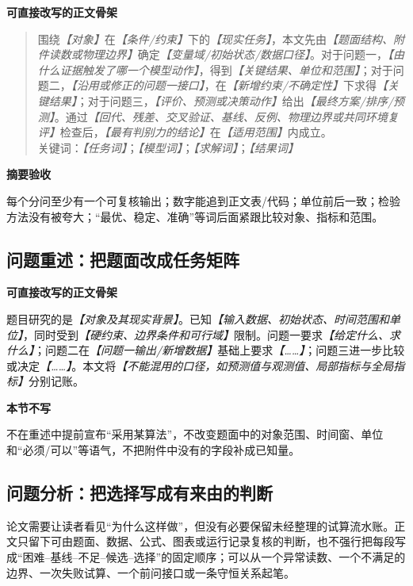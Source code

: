 \documentclass[UTF8,zihao=-4]{ctexart}
\newcommand{\slot}[1]{\textcolor{inkblue}{\textit{【#1】}}}
\newcommand{\guidehead}[1]{\par\medskip\noindent\textbf{\color{inkblue}#1}\par}
\begin{document}
\guidehead{可直接改写的正文骨架}
\begin{quote}\small
围绕\slot{对象}在\slot{条件/约束}下的\slot{现实任务}，本文先由\slot{题面结构、附件读数或物理边界}确定\slot{变量域/初始状态/数据口径}。对于问题一，\slot{由什么证据触发了哪一个模型动作}，得到\slot{关键结果、单位和范围}；对于问题二，\slot{沿用或修正的问题一接口}，在\slot{新增约束/不确定性}下求得\slot{关键结果}；对于问题三，\slot{评价、预测或决策动作}给出\slot{最终方案/排序/预测}。通过\slot{回代、残差、交叉验证、基线、反例、物理边界或共同环境复评}检查后，\slot{最有判别力的结论}在\slot{适用范围}内成立。\\
关键词：\slot{任务词}；\slot{模型词}；\slot{求解词}；\slot{结果词}
\end{quote}

\guidehead{摘要验收}每个分问至少有一个可复核输出；数字能追到正文表/代码；单位前后一致；检验方法没有被夸大；“最优、稳定、准确”等词后面紧跟比较对象、指标和范围。

\subsection{问题重述：把题面改成任务矩阵}

\guidehead{可直接改写的正文骨架}
题目研究的是\slot{对象及其现实背景}。已知\slot{输入数据、初始状态、时间范围和单位}，同时受到\slot{硬约束、边界条件和可行域}限制。问题一要求\slot{给定什么、求什么}；问题二在\slot{问题一输出/新增数据}基础上要求\slot{……}；问题三进一步比较或决定\slot{……}。本文将\slot{不能混用的口径，如预测值与观测值、局部指标与全局指标}分别记账。

\guidehead{本节不写}不在重述中提前宣布“采用某算法”，不改变题面中的对象范围、时间窗、单位和“必须/可以”等语气，不把附件中没有的字段补成已知量。

\subsection{问题分析：把选择写成有来由的判断}

论文需要让读者看见“为什么这样做”，但没有必要保留未经整理的试算流水账。正文只留下可由题面、数据、公式、图表或运行记录复核的判断，也不强行把每段写成“困难--基线--不足--候选--选择”的固定顺序；可以从一个异常读数、一个不满足的边界、一次失败试算、一个前问接口或一条守恒关系起笔。
\end{document}
